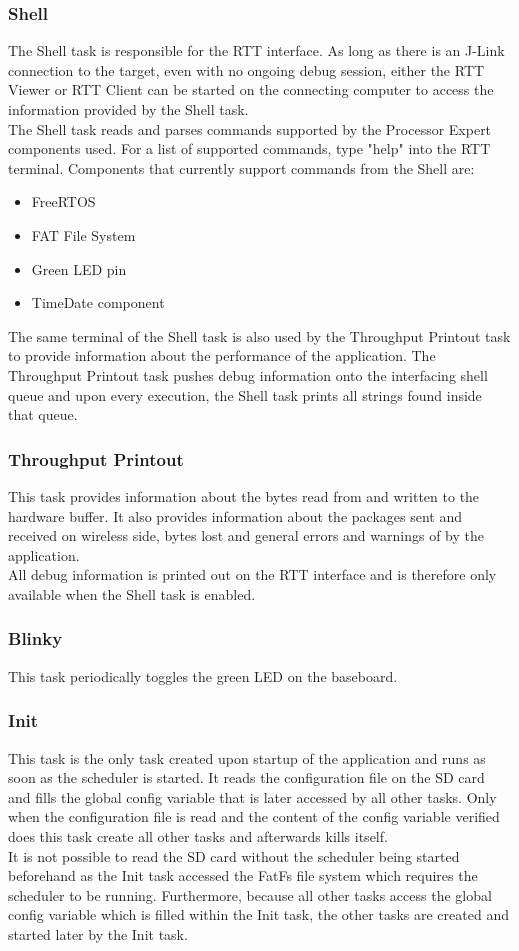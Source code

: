 \subsubsection{Shell}
The Shell task is responsible for the RTT interface. As long as there is an J-Link connection to the target, even with no ongoing debug session, either the RTT Viewer or RTT Client can be started on the connecting computer to access the information provided by the Shell task.\\
The Shell task reads and parses commands supported by the Processor Expert components used. For a list of supported commands, type "help" into the RTT terminal. Components that currently support commands from the Shell are:\begin{itemize}
    \item FreeRTOS
    \item FAT File System
    \item Green LED pin
    \item TimeDate component
\end{itemize}
The same terminal of the Shell task is also used by the Throughput Printout task to provide information about the performance of the application. The Throughput Printout task pushes debug information onto the interfacing shell queue and upon every execution, the Shell task prints all strings found inside that queue.
%
\subsubsection{Throughput Printout}
This task provides information about the bytes read from and written to the hardware buffer. It also provides information about the packages sent and received on wireless side, bytes lost and general errors and warnings of by the application.\\
All debug information is printed out on the RTT interface and is therefore only available when the Shell task is enabled.
%
\subsubsection{Blinky}
This task periodically toggles the green LED on the baseboard.
%
\subsubsection{Init} \label{subsubsec:txtInitTask}
This task is the only task created upon startup of the application and runs as soon as the scheduler is started. It reads the configuration file on the SD card and fills the global config variable that is later accessed by all other tasks. Only when the configuration file is read and the content of the config variable verified does this task create all other tasks and afterwards kills itself.\\
It is not possible to read the SD card without the scheduler being started beforehand as the Init task accessed the FatFs file system which requires the scheduler to be running. Furthermore, because all other tasks access the global config variable which is filled within the Init task, the other tasks are created and started later by the Init task.
%
